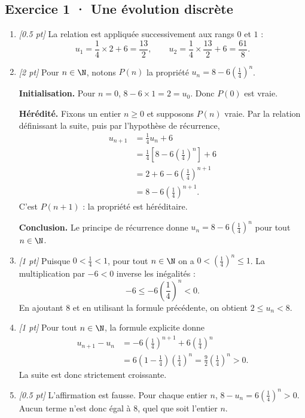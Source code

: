 \subsection*{Exercice 1 · Une évolution discrète}\begin{enumerate}

\item \textit{[\num{0,5} pt]} La relation est appliquée successivement aux rangs $0$ et $1$ :\[u_1=\frac{1}{4}\times 2+6=\frac{13}{2},\qquad u_2=\frac{1}{4}\times \frac{13}{2}+6=\frac{61}{8}.\]

\item \textit{[2 pt]} Pour $n\in\N$, notons $P(n)$ la propriété $u_n=8-6\left(\frac{1}{4}\right)^n$.
\par\smallskip\textbf{Initialisation.} Pour $n=0$, $8-6\times1=2=u_0$. Donc $P(0)$ est vraie.
\par\smallskip\textbf{Hérédité.} Fixons un entier $n\ge0$ et supposons $P(n)$ vraie. Par la relation définissant la suite, puis par l'hypothèse de récurrence,
\[\begin{aligned}u_{n+1}&=\frac{1}{4}u_n+6\\
&=\frac{1}{4}\left[8-6\left(\frac{1}{4}\right)^n\right]+6\\
&=2+6-6\left(\frac{1}{4}\right)^{n+1}\\
&=8-6\left(\frac{1}{4}\right)^{n+1}.
\end{aligned}\]
C'est $P(n+1)$ : la propriété est héréditaire.
\par\smallskip\textbf{Conclusion.} Le principe de récurrence donne $u_n=8-6\left(\frac{1}{4}\right)^n$ pour tout $n\in\N$.

\item \textit{[1 pt]} Puisque $0<\frac{1}{4}<1$, pour tout $n\in\N$ on a $0<(\frac{1}{4})^n\le1$. La multiplication par $-6<0$ inverse les inégalités :
\[-6\le-6(\frac{1}{4})^n<0.\]
En ajoutant $8$ et en utilisant la formule précédente, on obtient $2\le u_n<8$.

\item \textit{[1 pt]} Pour tout $n\in\N$, la formule explicite donne
\[\begin{aligned}u_{n+1}-u_n&=-6(\frac{1}{4})^{n+1}+6(\frac{1}{4})^n\\&=6(1-\frac{1}{4})(\frac{1}{4})^n=\frac{9}{2}(\frac{1}{4})^n>0.\end{aligned}\]
La suite est donc strictement croissante.

\item \textit{[\num{0,5} pt]} L'affirmation est fausse. Pour chaque entier $n$, $8-u_n=6(\frac{1}{4})^n>0$. Aucun terme n'est donc égal à $8$, quel que soit l'entier $n$.

\end{enumerate}

